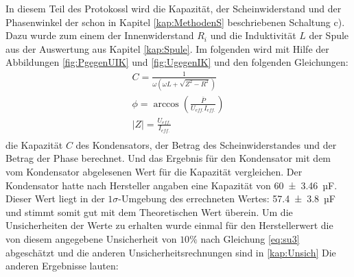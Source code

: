 In diesem Teil des Protokossl wird die Kapazität, der Scheinwiderstand und der Phasenwinkel der schon in Kapitel \ref{kap:MethodenS} beschriebenen Schaltung c). 
Dazu wurde zum einem der Innenwiderstand $R_i$ und die Induktivität $L$ der Spule aus der Auswertung aus Kapitel \ref{kap:Spule}.
Im folgenden wird mit Hilfe der Abbildungen \ref{fig:PgegenUIK} und \ref{fig:UgegenIK}
und den folgenden Gleichungen:
\begin{align}
C=\frac{1}{\omega (\omega L+\sqrt{Z^2-R^2})}\\	
\phi = \arccos\left(\frac{\bar{P}}{U_{eff.}I_{eff.}}\right)\\
	|Z|=\frac{U_{eff.}}{I_{eff.}}\\	
\end{align}
die Kapazität $C$ des Kondensators, der Betrag des Scheinwiderstandes und der Betrag der Phase berechnet. Und das Ergebnis für den Kondensator mit dem vom Kondensator abgelesenen Wert für die Kapazität vergleichen.
Der Kondensator hatte nach Hersteller angaben eine Kapazität von \SI{60+-3.46}{µF}.
Dieser Wert liegt in der $1\sigma$-Umgebung des errechneten Wertes: \SI{57.4+-3.8}{µF} und stimmt somit gut mit dem Theoretischen Wert überein.
Um die Unsicherheiten der Werte zu erhalten wurde einmal für den Herstellerwert die von diesem angegebene Unsicherheit von $10\%$ nach Gleichung
\ref{eq:su3} abgeschätzt und die anderen Unsicherheitsrechnungen sind in \ref{kap:Unsich}
Die anderen Ergebnisse lauten:
